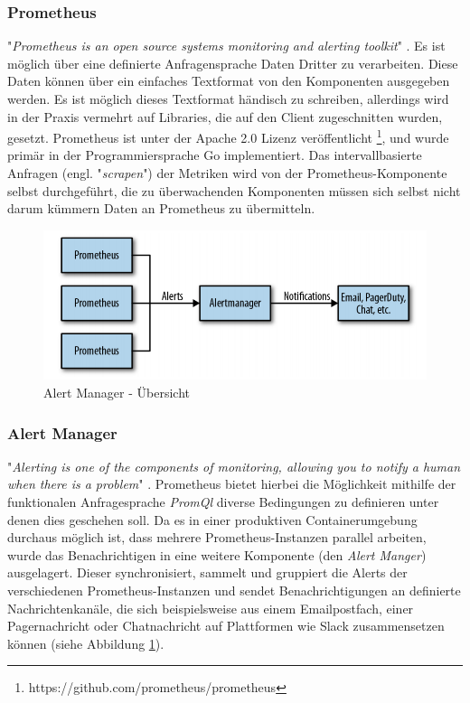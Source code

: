 \subsubsection{Prometheus \checkmark}
\label{ss:prometheus}
"\emph{Prometheus is an open source systems monitoring and alerting toolkit}" \cite[Seite~400]{oreillyPrometheus}. Es ist möglich über eine definierte Anfragensprache Daten Dritter zu verarbeiten. Diese Daten können über ein einfaches Textformat von den Komponenten ausgegeben werden. Es ist möglich dieses Textformat händisch zu schreiben, allerdings wird in der Praxis vermehrt auf Libraries, die auf den Client zugeschnitten wurden, gesetzt. Prometheus ist unter der Apache 2.0 Lizenz veröffentlicht \footnote{https://github.com/prometheus/prometheus}, und wurde primär in der Programmiersprache Go implementiert. Das intervallbasierte Anfragen (engl. "\emph{scrapen}") der Metriken wird von der Prometheus-Komponente selbst durchgeführt, die zu überwachenden Komponenten müssen sich selbst nicht darum kümmern Daten an Prometheus zu übermitteln.

\begin{figure}[ht!]
	\centering
	\includegraphics[width=.8\linewidth]{kapitel/problemloesung/implementierung/_img/alert-man-p291}
	\caption[Alert Manager - Übersicht]{Alert Manager - Übersicht \cite[Seite~291]{oreillyPrometheus}}
	\label{fig:alertManOverview}
\end{figure}

\subsubsection{Alert Manager \checkmark}
"\emph{Alerting is one of the components of monitoring, allowing you to notify a human when there is a problem}" \cite[Seite~291]{oreillyPrometheus}. Prometheus bietet hierbei die Möglichkeit mithilfe der funktionalen Anfragesprache \emph{PromQl} diverse Bedingungen zu definieren unter denen dies geschehen soll. Da es in einer produktiven Containerumgebung durchaus möglich ist, dass mehrere Prometheus-Instanzen parallel arbeiten, wurde das Benachrichtigen in eine weitere Komponente (den \emph{Alert Manger}) ausgelagert. Dieser synchronisiert, sammelt und gruppiert die Alerts der verschiedenen Prometheus-Instanzen und sendet Benachrichtigungen an definierte Nachrichtenkanäle, die sich beispielsweise aus einem Emailpostfach, einer Pagernachricht oder Chatnachricht auf Plattformen wie Slack zusammensetzen können (siehe Abbildung \ref{fig:alertManOverview}).


